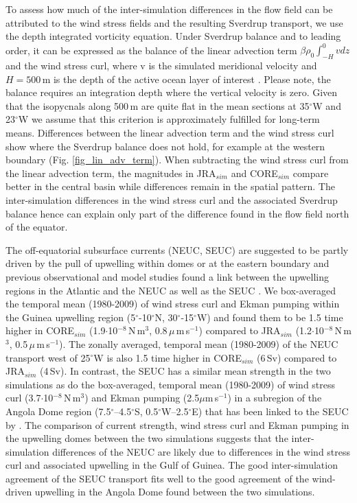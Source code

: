 \documentclass[os, manuscript]{copernicus}
\begin{document}
	To assess how much of the inter-simulation differences in the flow field can be attributed to the wind stress fields and the resulting Sverdrup transport, we use the depth integrated vorticity equation. Under Sverdrup balance and to leading order, it can be expressed as the balance of the linear advection term $\beta \rho_0 \int_{-H}^{0} v dz$ and the wind stress curl, where v is the simulated meridional velocity and $H=500\,$m is the depth of the active ocean layer of interest \citep{Small2015}. Please note, the balance requires an integration depth where the vertical velocity is zero. Given that the isopycnals along 500$\,$m are quite flat in the mean sections at 35$^{\circ}$W and 23$^{\circ}$W we assume that this criterion is approximately fulfilled for long-term means. Differences between the linear advection term and the wind stress curl show where the Sverdrup balance does not hold, for example at the western boundary (Fig. \ref{fig_lin_adv_term}). When subtracting the wind stress curl from the linear advection term, the magnitudes in JRA$_{sim}$ and CORE$_{sim}$ compare better in the central basin while differences remain in the spatial pattern. The inter-simulation differences in the wind stress curl and the associated Sverdrup balance hence can explain only part of the difference found in the flow field north of the equator.
	
	The off-equatorial subsurface currents (NEUC, SEUC) are suggested to be partly driven by the pull of upwelling within domes or at the eastern boundary \citep{Furue2007,Furue2009,McCreary2002a} and previous observational and model studies found a link between the upwelling regions in the Atlantic and the NEUC \citep{Stramma2005,Huettl2008,Goes2013} as well as the SEUC \citep{Doi2007}. We box-averaged the temporal mean (1980-2009) of wind stress curl and Ekman pumping within the Guinea upwelling region (5$^{\circ}$-10$^{\circ}$N, 30$^{\circ}$-15$^{\circ}$W) and found them to be 1.5 time higher in CORE$_{sim}$ (1.9$\cdot$10$^{-8}\,$N$\,$m$^3$, 0.8$\,\mu\,$m$\,$s$ ^{-1} $) compared to JRA$_{sim}$ (1.2$\cdot$10$^{-8}\,$N$\,$m$^3$, 0.5$\,\mu\,$m$\,$s$ ^{-1} $). The zonally averaged, temporal mean (1980-2009) of the NEUC transport west of 25$^{\circ}$W is also 1.5 time higher in CORE$_{sim}$ (6$\,$Sv) compared to JRA$_{sim}$ (4$\,$Sv). In contrast, the SEUC has a similar mean strength in the two simulations as do the box-averaged, temporal mean (1980-2009) of wind stress curl (3.7$\cdot$10$^{-8}\,$N$\,$m$^3$) and Ekman pumping (2.5$\mu$m$\,$s$ ^{-1} $) in a subregion of the Angola Dome region (7.5$^{\circ}$–4.5$^{\circ}$S, 0.5$^{\circ}$W–2.5$^{\circ}$E) that has been linked to the SEUC by \cite{Doi2007}. The comparison of current strength, wind stress curl and Ekman pumping in the upwelling domes between the two simulations suggests that the inter-simulation differences of the NEUC are likely due to differences in the wind stress curl and associated upwelling in the Gulf of Guinea. The good inter-simulation agreement of the SEUC transport fits well to the good agreement of the wind-driven upwelling in the Angola Dome found between the two simulations. 
	
\end{document}
